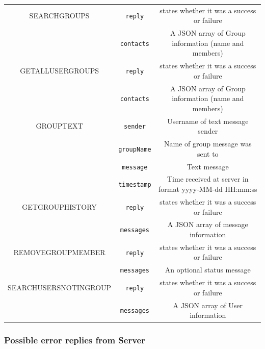 \begin{table}[H]
\begin{tabular}{ |c|c|c| }
 SEARCHGROUPS & \verb|reply| &  states whether it was a success or failure \\ 
  & \verb|contacts| &  A JSON array of Group information (name and members) \\ 
  \hline
  GETALLUSERGROUPS & \verb|reply| &  states whether it was a success or failure \\ 
  & \verb|contacts| &  A JSON array of Group information (name and members) \\ 
  \hline
  GROUPTEXT & \verb|sender| & Username of text message sender  \\
  &\verb|groupName|& Name of group message was sent to \\ 
  & \verb|message| & Text message   \\ 
   & \verb|timestamp| & Time received at server in format yyyy-MM-dd HH:mm:ss \\ 
  \hline
  GETGROUPHISTORY & \verb|reply| &  states whether it was a success or failure \\ 
  & \verb|messages| &  A JSON array of message information \\ 
  \hline
  REMOVEGROUPMEMBER & \verb|reply| &  states whether it was a success or failure \\ 
  & \verb|messages| &  An optional status message \\ 
  \hline
  SEARCHUSERSNOTINGROUP & \verb|reply| &  states whether it was a success or failure \\ 
  & \verb|messages| &  A JSON array of User information \\ 
  \hline
 
\end{tabular}
\end{table}





\subsubsection{Possible error replies from Server}
\label{api}

